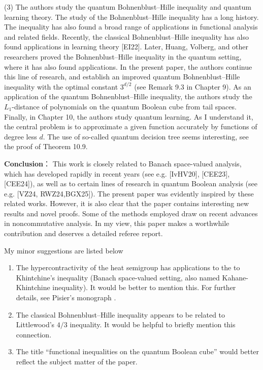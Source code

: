 \documentclass[a4paper, 11pt]{article}
\begin{document}
(3) The authors study the quantum Bohnenblust–Hille inequality and  quantum learning theory.  The study of the Bohnenblust–Hille inequality has a long history. The inequality has also found a broad range of applications in functional analysis and related fields. Recently, the classical Bohnenblust–Hille inequality has also found applications in learning theory [EI22]. Later, Huang, Volberg, and other researchers proved the   Bohnenblust–Hille inequality in the quantum setting, where it has also found applications. In the present paper, the authors continue this line of research, and establish an improved  quantum Bohnenblust–Hille inequality with the optimal constant $3^{d/2}$ (see Remark 9.3 in Chapter 9).   As an application of the  quantum Bohnenblust–Hille inequality, the authors study the \(L_1\)-distance of polynomials on the quantum Boolean cube from tail spaces.   Finally, in Chapter 10, the authors study quantum learning. As I understand it, the central problem is to approximate a given function accurately by functions of  degree less $d$. The use of so-called quantum decision tree seems interesting, see the proof of Theorem 10.9. 
 
 \medskip
 
 {\bf Conclusion}：
 This work is closely related to Banach space-valued  analysis, which has developed rapidly in recent years (see e.g. [IvHV20], [CEE23], [CEE24]), as well as to certain lines of research in quantum Boolean analysis (see e.g. [VZ24, RWZ24,BGX25]).  The present paper was evidently inspired by these related works.  However, it is also clear that the paper contains interesting new results and novel proofs. Some of the methods employed draw on recent advances in noncommutative analysis. In my view, this paper makes a worthwhile contribution and deserves a detailed referee report.
 
 
\medskip

 
 My minor suggestions are listed below
 
 \begin{enumerate}
 	\item The hypercontractivity of the heat semigroup has applications to the  to Khintchine’s inequality (Banach space-valued setting, also named Kahane-Khintchine inequality).  It would be better to mention this. For further details, see Pisier’s monograph \cite{Pi2016}. 
 	
 	
 	\item The classical Bohnenblust–Hille inequality appears to be related to Littlewood’s \(4/3\) inequality. It would be helpful to briefly mention this connection.
 	
 	\item  The title ``functional inequalities on the quantum Boolean cube'' would better reflect the subject matter of the paper.  
 \end{enumerate}
\end{document}
